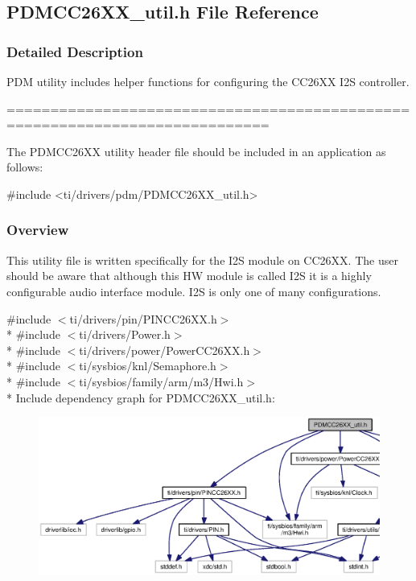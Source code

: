 \subsection{P\+D\+M\+C\+C26\+X\+X\+\_\+util.\+h File Reference}
\label{_p_d_m_c_c26_x_x__util_8h}


\subsubsection{Detailed Description}
P\+D\+M utility includes helper functions for configuring the C\+C26\+X\+X I2\+S controller. 

============================================================================

The P\+D\+M\+C\+C26\+X\+X utility header file should be included in an application as follows\+: 
\begin{DoxyCode}
\textcolor{preprocessor}{#include <ti/drivers/pdm/PDMCC26XX_util.h>}
\end{DoxyCode}


\subsubsection*{Overview}

This utility file is written specifically for the I2\+S module on C\+C26\+X\+X. The user should be aware that although this H\+W module is called I2\+S it is a highly configurable audio interface module. I2\+S is only one of many configurations.



{\ttfamily \#include $<$ti/drivers/pin/\+P\+I\+N\+C\+C26\+X\+X.\+h$>$}\\*
{\ttfamily \#include $<$ti/drivers/\+Power.\+h$>$}\\*
{\ttfamily \#include $<$ti/drivers/power/\+Power\+C\+C26\+X\+X.\+h$>$}\\*
{\ttfamily \#include $<$ti/sysbios/knl/\+Semaphore.\+h$>$}\\*
{\ttfamily \#include $<$ti/sysbios/family/arm/m3/\+Hwi.\+h$>$}\\*
Include dependency graph for P\+D\+M\+C\+C26\+X\+X\+\_\+util.\+h\+:
\nopagebreak
\begin{figure}[H]
\begin{center}
\leavevmode
\includegraphics[width=350pt]{_p_d_m_c_c26_x_x__util_8h__incl}
\end{center}
\end{figure}
